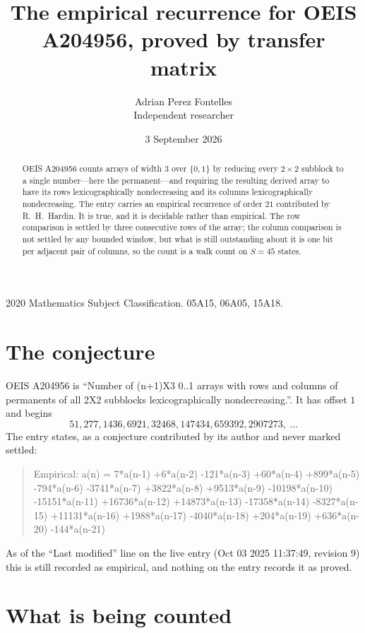 \documentclass[11pt,a4paper]{article}
\title{The empirical recurrence for OEIS A204956, proved by transfer matrix}
\author{Adrian Perez Fontelles\\ \small Independent researcher}
\date{3 September 2026}
\theoremstyle{plain}
\theoremstyle{definition}
\begin{document}
\maketitle

\begin{abstract}
OEIS A204956 counts arrays of width $3$ over $\{0,1\}$ by reducing every $2\times2$ subblock to a
single number---here the permanent---and requiring the resulting derived array to have its rows
lexicographically nondecreasing and its columns lexicographically nondecreasing. The entry carries an
empirical recurrence of order $21$ contributed by R.~H.~Hardin. It is true, and it is
decidable rather than empirical. The row comparison is settled by three consecutive rows of the
array; the column comparison is not settled by any bounded window, but what is still outstanding
about it is one bit per adjacent pair of columns, so the count is a walk count on $S=45$
states.
\end{abstract}

\noindent\small 2020 Mathematics Subject Classification. 05A15, 06A05, 15A18.\normalsize

\section{The conjecture}

OEIS A204956 is ``Number of (n+1)X3 0..1 arrays with rows and columns of permanents of all 2X2 subblocks lexicographically nondecreasing.''. It has offset $1$ and begins
\[
51, 277, 1436, 6921, 32468, 147434, 659392, 2907273,\ \dots
\]
The entry states, as a conjecture contributed by its author and never marked settled:
\begin{quote}
Empirical: a(n) = 7*a(n-1) +6*a(n-2) -121*a(n-3) +60*a(n-4) +899*a(n-5) -794*a(n-6) -3741*a(n-7) +3822*a(n-8) +9513*a(n-9) -10198*a(n-10) -15151*a(n-11) +16736*a(n-12) +14873*a(n-13) -17358*a(n-14) -8327*a(n-15) +11131*a(n-16) +1988*a(n-17) -4040*a(n-18) +204*a(n-19) +636*a(n-20) -144*a(n-21)
\end{quote}
As of the ``Last modified'' line on the live entry (Oct 03 2025 11:37:49, revision 9) this is still
recorded as empirical, and nothing on the entry records it as proved.

\section{What is being counted}
\end{document}
